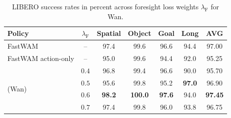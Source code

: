 \begin{table}[ht]
\vspace{-2mm}
\caption{LIBERO success rates in percent across foresight loss weights $\lambda_{\mathrm F}$ for Wan.}
\label{tab:lambdaweight}
\begin{center}
\small\setlength{\tabcolsep}{5pt}
\begin{tabular}{lc ccccc}
\toprule
Policy & $\lambda_{\mathrm F}$ & Spatial & Object & Goal & Long & AVG \\
\midrule
FastWAM & -- & 97.4 & 99.6 & 96.6 & 94.4 & 97.00 \\
FastWAM action-only & -- & 95.0 & 99.6 & 94.4 & 92.0 & 95.25 \\
\midrule
\multirow{4}{*}{\modelname{} (Wan)} & $0.4$ & 96.8 & 99.4 & 96.6 & 90.0 & 95.70 \\
& $0.5$ & 95.6 & 99.8 & 95.2 & \textbf{97.0} & 96.90 \\
& $\mathbf{0.6}$ & \textbf{98.2} & \textbf{100.0} & \textbf{97.6} & 94.0 & \textbf{97.45} \\
& $0.7$ & 97.4 & 99.8 & 96.0 & 93.8 & 96.75 \\
\bottomrule
\end{tabular}
\end{center}
\vspace{-2mm}
\end{table}
